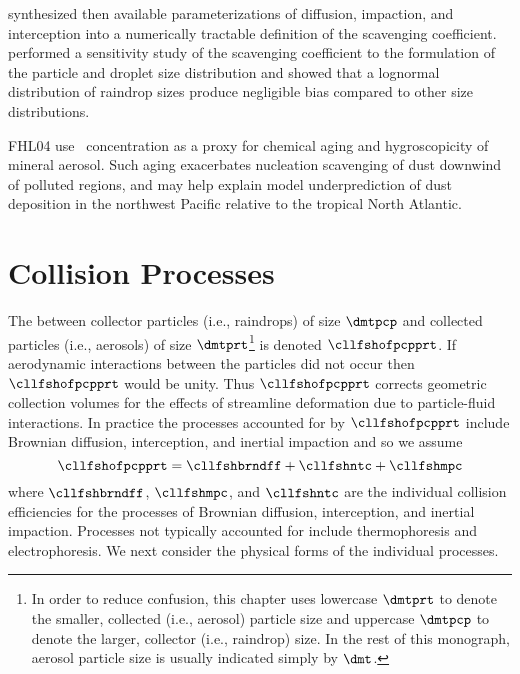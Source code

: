 \documentclass[12pt,twoside]{book}
\begin{document}
\cite{DaH76} synthesized then available parameterizations of
diffusion, impaction, and interception into a numerically tractable
definition of the scavenging coefficient.
\cite{NGD94} performed a sensitivity study of the scavenging
coefficient to the formulation of the particle and droplet size
distribution and showed that a lognormal distribution of raindrop
sizes produce negligible bias compared to other size distributions.

FHL04 use \SOd\ concentration as a proxy for chemical aging and
hygroscopicity of mineral aerosol.
Such aging exacerbates nucleation scavenging of dust downwind of
polluted regions, and may help explain model underprediction of dust
deposition in the northwest Pacific relative to the tropical North
Atlantic.

\section[Collision Processes]{Collision Processes}\label{sxn:cll_prc}
The  between collector particles (i.e.,
raindrops) of size $\dmtpcp$ and collected particles (i.e., aerosols)
of size $\dmtprt$\footnote{In order to reduce confusion, this chapter
uses lowercase $\dmtprt$ to denote the smaller, collected (i.e.,
aerosol) particle size and uppercase $\dmtpcp$ to denote the larger,
collector (i.e., raindrop) size. 
In the rest of this monograph, aerosol particle size is usually
indicated simply by $\dmt$.} is denoted $\cllfshofpcpprt$. 
If aerodynamic interactions between the particles did not occur then
$\cllfshofpcpprt$ would be unity.
Thus $\cllfshofpcpprt$ corrects geometric collection volumes for the
effects of streamline deformation due to particle-fluid interactions.
In practice the processes accounted for by $\cllfshofpcpprt$ include
Brownian diffusion, interception, and inertial impaction and so we 
assume
\begin{equation}
\cllfshofpcpprt = \cllfshbrndff + \cllfshntc + \cllfshmpc
\label{eqn:cll_fsh_dfn_1}
\end{equation}
where $\cllfshbrndff$, $\cllfshmpc$, and $\cllfshntc$ are the
individual collision efficiencies for the processes of Brownian
diffusion, interception, and inertial impaction.
Processes not typically accounted for include thermophoresis and
electrophoresis. 
We next consider the physical forms of the individual processes.
\end{document}
